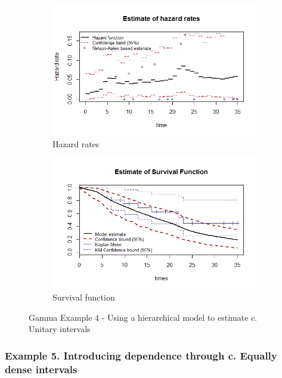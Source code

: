 \documentclass[letterpaper]{article}\usepackage[]{graphicx}\usepackage[]{color}
\begin{document}
\begin{figure}
  \centering
  \begin{subfigure}[a]{\textwidth}\centering
    \includegraphics[width=\textwidth]{G41.png}
    \caption{Hazard rates}
  \end{subfigure}
  \begin{subfigure}[b]{\textwidth}\centering
    \includegraphics[width=\textwidth]{G42.png}
    \caption{Survival function}
  \end{subfigure}
  \caption{Gamma Example 4 - Using a hierarchical model to estimate $c$. Unitary intervals}
  \label{fig:G4}
\end{figure}

\subsubsection{Example 5. Introducing dependence through c. Equally dense intervals}
\end{document}
